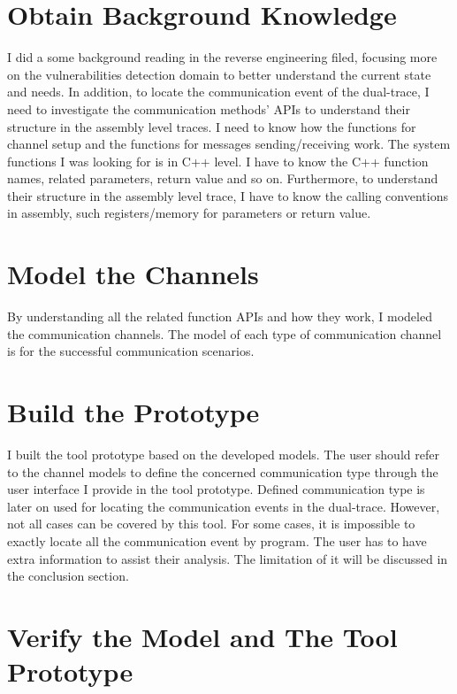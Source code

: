 \section{Obtain Background Knowledge}
I did a some background reading in the reverse engineering filed, focusing more on the vulnerabilities detection domain to better understand the current state and needs. In addition, to locate the communication event of the dual-trace, I need to investigate the communication methods' APIs to understand their structure in the assembly level traces. I need to know how the functions for channel setup and the functions for messages sending/receiving work. The system functions I was looking for is in C++ level. I have to know the C++ function names, related parameters, return value and so on. Furthermore, to understand their structure in the assembly level trace, I have to know the calling conventions in assembly, such registers/memory for parameters or return value.

\section{Model the Channels}
By understanding all the related function APIs and how they work, I modeled the communication channels. The model of each type of communication channel is for the successful communication scenarios.

\section{Build the Prototype}
I built the tool prototype based on the developed models. The user should refer to the channel models to define the concerned communication type through the user interface I provide in the tool prototype. Defined communication type is later on used for locating the communication events in the dual-trace. However, not all cases  can be covered by this tool. For some cases, it is impossible to exactly locate all the communication event by program. The user has to have extra information to assist their analysis. The limitation of it will be discussed in the conclusion section.

\section{Verify the Model and The Tool Prototype}


\setlength{\unitlength}{\savedunitlength}
